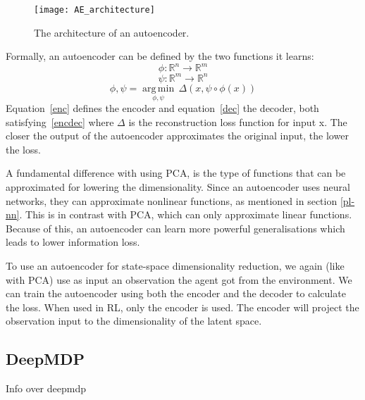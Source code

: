 \begin{figure}[h]
    \centering
    \texttt{[image: AE\_architecture]}
    \caption{The architecture of an autoencoder.}
    \label{fig:AE_architecture}
\end{figure}

Formally, an autoencoder can be defined by the two functions it learns: 
\begin{equation}
  \label{enc}
  \phi :{\mathbb{R}^n}\rightarrow {\mathbb{R}^m}
\end{equation}
\begin{equation}
  \label{dec}
  \psi :{\mathbb{R}^m}\rightarrow {\mathbb{R}^n}
\end{equation}
\begin{equation}
  \label{encdec}
  \phi ,\psi ={\underset {\phi ,\psi }{\operatorname {arg\,min} }}\,{\Delta}(x, \psi \circ \phi (x))
\end{equation}
Equation~\eqref{enc} defines the encoder and equation~\eqref{dec} the decoder, both satisfying~\eqref{encdec} where $\Delta$ is the reconstruction loss function for input x. The closer the output of the autoencoder approximates the original input, the lower the loss.

A fundamental difference with using PCA, is the type of functions that can be approximated for lowering the dimensionality. Since an autoencoder uses neural networks, they can approximate nonlinear functions, as mentioned in section \ref{pl-nn}. This is in contrast with PCA, which can only approximate linear functions. Because of this, an autoencoder can learn more powerful generalisations which leads to lower information loss\cite{AE_general}.

To use an autoencoder for state-space dimensionality reduction, we again (like with PCA) use as input an observation the agent got from the environment. We can train the autoencoder using both the encoder and the decoder to calculate the loss. When used in RL, only the encoder is used. The encoder will project the observation input to the dimensionality of the latent space. 

\subsection{DeepMDP}\label{pl-deepmdp}
Info over deepmdp
